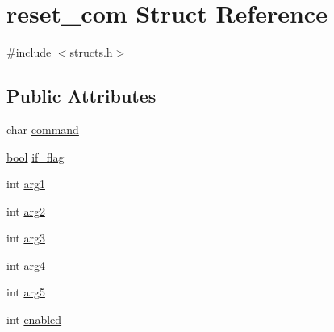\hypertarget{structreset__com}{\section{reset\-\_\-com Struct Reference}
\label{structreset__com}
}


{\ttfamily \#include $<$structs.\-h$>$}

\subsection*{Public Attributes}
\begin{DoxyCompactItemize}
\item 
char \hyperlink{structreset__com_a6cca09d17ef8ba4765b1bddfe1cb6e31}{command}
\item 
\hyperlink{structs_8h_ad5c9d4ba3dc37783a528b0925dc981a0}{bool} \hyperlink{structreset__com_a255ba6742e464970df5f61fc9b8ccdf2}{if\-\_\-flag}
\item 
int \hyperlink{structreset__com_a635a6d7d405f9fda34d53803b48cc652}{arg1}
\item 
int \hyperlink{structreset__com_a413552875fa3046ab670a408918494e1}{arg2}
\item 
int \hyperlink{structreset__com_abe997d85fe29ad69fced2bd95be362f7}{arg3}
\item 
int \hyperlink{structreset__com_ae37b00076aad4228e62e64d9381faa2b}{arg4}
\item 
int \hyperlink{structreset__com_aabf92f34a2d4a1bc0bb0a8fd06815fb6}{arg5}
\item 
int \hyperlink{structreset__com_a369ae25ef1e17e4ae30d54d94c095cfd}{enabled}
\end{DoxyCompactItemize}


